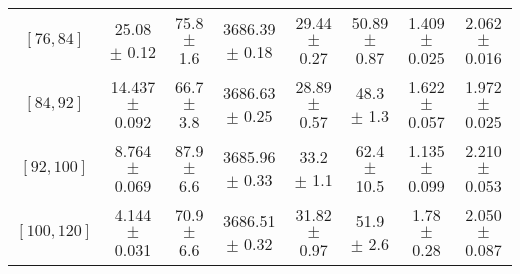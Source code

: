 \begin{tabular}{c||c|c|c|c|c|c|c}
$[76, 84]$ & 25.08 $\pm$ 0.12 & 75.8 $\pm$ 1.6 & 3686.39 $\pm$ 0.18 & 29.44 $\pm$ 0.27 & 50.89 $\pm$ 0.87 & 1.409 $\pm$ 0.025 & 2.062 $\pm$ 0.016\\
$[84, 92]$ & 14.437 $\pm$ 0.092 & 66.7 $\pm$ 3.8 & 3686.63 $\pm$ 0.25 & 28.89 $\pm$ 0.57 & 48.3 $\pm$ 1.3 & 1.622 $\pm$ 0.057 & 1.972 $\pm$ 0.025\\
$[92, 100]$ & 8.764 $\pm$ 0.069 & 87.9 $\pm$ 6.6 & 3685.96 $\pm$ 0.33 & 33.2 $\pm$ 1.1 & 62.4 $\pm$ 10.5 & 1.135 $\pm$ 0.099 & 2.210 $\pm$ 0.053\\
$[100, 120]$ & 4.144 $\pm$ 0.031 & 70.9 $\pm$ 6.6 & 3686.51 $\pm$ 0.32 & 31.82 $\pm$ 0.97 & 51.9 $\pm$ 2.6 & 1.78 $\pm$ 0.28 & 2.050 $\pm$ 0.087\\
\end{tabular}
